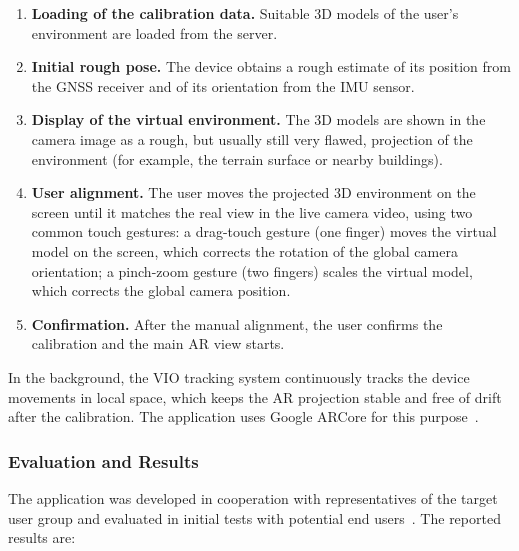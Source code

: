 \begin{enumerate}
    \item \textbf{Loading of the calibration data.} Suitable 3D models of the user's environment are loaded from the server.
    \item \textbf{Initial rough pose.} The device obtains a rough estimate of its position from the GNSS receiver and of its orientation from the IMU sensor.
    \item \textbf{Display of the virtual environment.} The 3D models are shown in the camera image as a rough, but usually still very flawed, projection of the environment (for example, the terrain surface or nearby buildings).
    \item \textbf{User alignment.} The user moves the projected 3D environment on the screen until it matches the real view in the live camera video, using two common touch gestures: a drag-touch gesture (one finger) moves the virtual model on the screen, which corrects the rotation of the global camera orientation; a pinch-zoom gesture (two fingers) scales the virtual model, which corrects the global camera position.
    \item \textbf{Confirmation.} After the manual alignment, the user confirms the calibration and the main AR view starts.
\end{enumerate}

In the background, the VIO tracking system continuously tracks the device movements in local space, which keeps the AR projection stable and free of drift after the calibration. The application uses Google ARCore for this purpose~\cite{burkard2022gistam}.

\subsubsection{Evaluation and Results}

The application was developed in cooperation with representatives of the target user group and evaluated in initial tests with potential end users~\cite{burkard2022gistam}. The reported results are:

